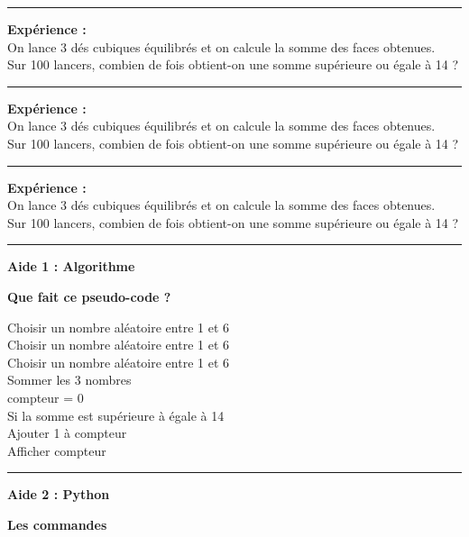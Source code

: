 \documentclass[20pt]{article}
\begin{document}
\vspace{0.2cm}
\hrule
\vspace{1cm}
\textbf{Expérience :} \\
On lance 3 dés cubiques équilibrés et on calcule la somme des faces obtenues. \\
Sur 100 lancers, combien  de fois obtient-on une somme supérieure ou égale  à 14 ?
\vspace{0.2cm}
\hrule
\vspace{1cm}
\textbf{Expérience :} \\
On lance 3 dés cubiques équilibrés et on calcule la somme des faces obtenues. \\
Sur 100 lancers, combien  de fois obtient-on une somme supérieure ou égale à 14 ?
\vspace{0.2cm}
\hrule
\vspace{1cm}
\textbf{Expérience :} \\
On lance 3 dés cubiques équilibrés et on calcule la somme des faces obtenues. \\
Sur 100 lancers, combien  de fois obtient-on une somme supérieure ou égale à 14 ?
\vspace{0.2cm}
\hrule
\vspace{1cm}

\newpage


\textbf{Aide 1 : Algorithme}

\textbf{Que fait ce pseudo-code ?}

Choisir un nombre aléatoire entre 1 et 6\\
Choisir un nombre aléatoire entre 1 et 6\\
Choisir un nombre aléatoire entre 1 et 6\\
Sommer les 3 nombres\\
compteur = 0\\
Si la somme est supérieure à égale à 14\\
\hspace{1cm} Ajouter 1 à compteur \\
Afficher  compteur  \\
\vspace{0.2cm}
\hrule
\vspace{0.2cm}

\textbf{Aide 2 : Python}

\textbf{Les commandes}
\end{document}
